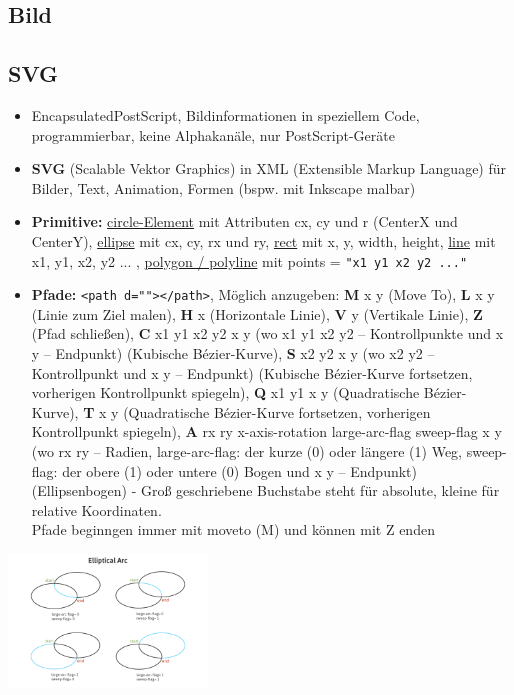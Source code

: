 \documentclass[12pt,landscape]{article}
\def\code#1{\texttt{#1}} %
\begin{document}
\begin{multicols}{3}
\section{Bild}
\subsection{SVG}
\begin{itemize}
\item EncapsulatedPostScript, Bildinformationen in speziellem Code, programmierbar, keine Alphakanäle, nur PostScript-Geräte
\item \textbf{SVG} (Scalable Vektor Graphics) in XML (Extensible Markup Language) für Bilder, Text, Animation, Formen (bspw. mit Inkscape malbar)
\item \textbf{Primitive:} \underline{circle-Element} mit Attributen cx, cy und r (CenterX und CenterY), \underline{ellipse} mit cx, cy, rx und ry, \underline{rect} mit x, y, width, height, \underline{line} mit x1, y1, x2, y2 ... , \underline{polygon / polyline} mit points = \code{"x1 y1 x2 y2 ..."}
\item \textbf{Pfade:} \lstinline|<path d=""></path>|, Möglich anzugeben: \textbf{M} x y (Move To), \textbf{L} x y (Linie zum Ziel malen), \textbf{H} x (Horizontale Linie), \textbf{V} y (Vertikale Linie), \textbf{Z} (Pfad schließen), \textbf{C} x1 y1 x2 y2 x y (wo x1 y1 x2 y2 -- Kontrollpunkte und x y -- Endpunkt) (Kubische Bézier-Kurve), \textbf{S} x2 y2 x y (wo x2 y2 -- Kontrollpunkt und x y -- Endpunkt) (Kubische Bézier-Kurve fortsetzen, vorherigen Kontrollpunkt spiegeln), \textbf{Q} x1 y1 x y (Quadratische Bézier-Kurve), \textbf{T} x y (Quadratische Bézier-Kurve fortsetzen, vorherigen Kontrollpunkt spiegeln), \textbf{A} rx ry x-axis-rotation large-arc-flag sweep-flag x y (wo rx ry -- Radien, large-arc-flag: der kurze (0) oder längere (1) Weg, sweep-flag: der obere (1) oder untere (0) Bogen und x y -- Endpunkt)  (Ellipsenbogen) - Groß geschriebene Buchstabe steht für absolute, kleine für relative Koordinaten.\\Pfade beginngen immer mit moveto (M) und können mit Z enden
\end{itemize}
\begin{center}
\includegraphics[height=100pt]{svg-path.png}\\

\end{center}
\end{multicols}
\end{document}

